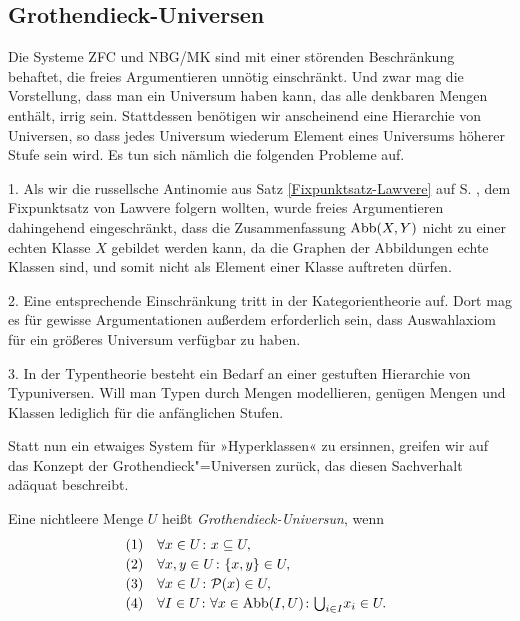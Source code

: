 \subsection{Grothendieck-Universen}

Die Systeme ZFC und NBG/MK sind mit einer störenden Beschränkung
behaftet, die freies Argumentieren unnötig einschränkt. Und zwar
mag die Vorstellung, dass man ein Universum haben kann, das alle
denkbaren Mengen enthält, irrig sein. Stattdessen benötigen wir
anscheinend eine Hierarchie von Universen, so dass jedes Universum
wiederum Element eines Universums höherer Stufe sein wird. Es tun sich
nämlich die folgenden Probleme auf.

1. Als wir die russellsche Antinomie aus Satz \ref{Fixpunktsatz-Lawvere}
auf S. \pageref{Fixpunktsatz-Lawvere}, dem Fixpunktsatz von Lawvere folgern
wollten, wurde freies Argumentieren dahingehend eingeschränkt,
dass die Zusammenfassung $\operatorname{Abb}(X,Y)$ nicht zu einer echten Klasse $X$
gebildet werden kann, da die Graphen der Abbildungen echte Klassen sind,
und somit nicht als Element einer Klasse auftreten dürfen.

2. Eine entsprechende Einschränkung tritt in der Kategorientheorie
auf. Dort mag es für gewisse Argumentationen außerdem erforderlich sein,
dass Auswahlaxiom für ein größeres Universum verfügbar zu haben.

3. In der Typentheorie besteht ein Bedarf an einer gestuften
Hierarchie von Typuniversen. Will man Typen durch Mengen modellieren,
genügen Mengen und Klassen lediglich für die anfänglichen Stufen.

Statt nun ein etwaiges System für »Hyperklassen« zu ersinnen, greifen wir
auf das Konzept der Grothendieck"=Universen zurück, das diesen
Sachverhalt adäquat beschreibt.

\newpage
\begin{Definition}\newlinefirst
Eine nichtleere Menge $U$ heißt \emph{Grothendieck-Universun}, wenn
\[\begin{array}{@{}r@{\quad}l}
\text{(1)} & \forall x\in U\colon x\subseteq U,\\[2pt]
\text{(2)} & \forall x,y\in U\colon \{x,y\}\in U,\\[2pt]
\text{(3)} & \forall x\in U\colon\powerset(x)\in U,\\[2pt]
\text{(4)} & \forall I\in U\colon\forall x\in\operatorname{Abb}(I,U)\colon
  {\textstyle\bigcup_{i\in I}} x_i\in U.
\end{array}\]
\end{Definition}

